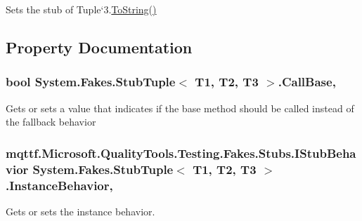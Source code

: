 Sets the stub of Tuple`3.\hyperlink{class_system_1_1_fakes_1_1_stub_tuple_3_01_t1_00_01_t2_00_01_t3_01_4_a0da1e81ee8fdc2cc26daf43d40ced721}{To\-String()}



\subsection{Property Documentation}
\hypertarget{class_system_1_1_fakes_1_1_stub_tuple_3_01_t1_00_01_t2_00_01_t3_01_4_ad7cffea3f47302ea4ef7ad9d53069eaf}{
\subsubsection[{Call\-Base}]{\setlength{\rightskip}{0pt plus 5cm}bool System.\-Fakes.\-Stub\-Tuple$<$ T1, T2, T3 $>$.Call\-Base\hspace{0.3cm}{\ttfamily [get]}, {\ttfamily [set]}}}\label{class_system_1_1_fakes_1_1_stub_tuple_3_01_t1_00_01_t2_00_01_t3_01_4_ad7cffea3f47302ea4ef7ad9d53069eaf}


Gets or sets a value that indicates if the base method should be called instead of the fallback behavior

\hypertarget{class_system_1_1_fakes_1_1_stub_tuple_3_01_t1_00_01_t2_00_01_t3_01_4_ac9288047e393bf1f5fd425718615ec13}{
\subsubsection[{Instance\-Behavior}]{\setlength{\rightskip}{0pt plus 5cm}mqttf.\-Microsoft.\-Quality\-Tools.\-Testing.\-Fakes.\-Stubs.\-I\-Stub\-Behavior System.\-Fakes.\-Stub\-Tuple$<$ T1, T2, T3 $>$.Instance\-Behavior\hspace{0.3cm}{\ttfamily [get]}, {\ttfamily [set]}}}\label{class_system_1_1_fakes_1_1_stub_tuple_3_01_t1_00_01_t2_00_01_t3_01_4_ac9288047e393bf1f5fd425718615ec13}


Gets or sets the instance behavior.

